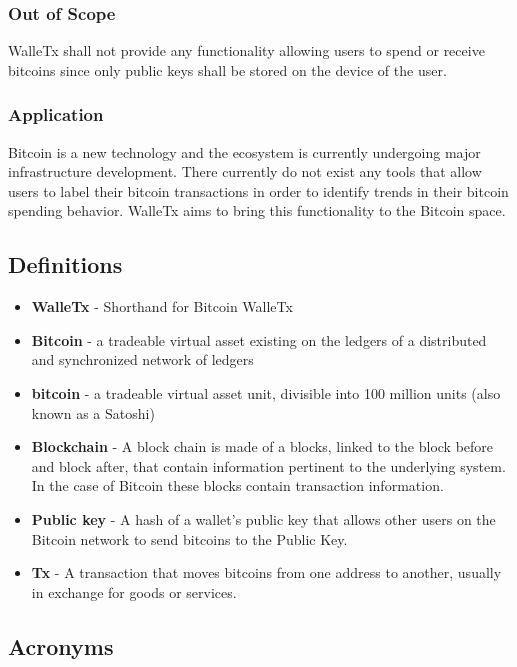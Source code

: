   \subsubsection{Out of Scope}
  WalleTx shall not provide any functionality allowing users to spend or receive bitcoins since only public keys shall be stored on the device of the user.
	
  \subsubsection{Application} 
  Bitcoin is a new technology and the ecosystem is currently undergoing major infrastructure development. There currently do not exist any tools that allow users to label their bitcoin transactions in order to identify trends in their bitcoin spending behavior. WalleTx aims to bring this functionality to the Bitcoin space.
    
	\subsection{Definitions}

	\begin{itemize}
    \item \textbf{WalleTx} - Shorthand for Bitcoin WalleTx
    \item \textbf{Bitcoin} - a tradeable virtual asset existing on the ledgers of a distributed and synchronized network of ledgers
    \item \textbf{bitcoin} - a tradeable virtual asset unit, divisible into 100 million units (also known as a Satoshi) 
    \item \textbf{Blockchain} - A block chain is made of a blocks, linked to the block before and block after, that contain information pertinent to the underlying system. In the case of Bitcoin these blocks contain transaction information.
    \item \textbf{Public key} - A hash of a wallet's public key that allows other users on the Bitcoin network to send bitcoins to the Public Key. 
    \item \textbf{Tx} - A transaction that moves bitcoins from one address to another, usually in exchange for goods or services.
	\end{itemize}

	\subsection{Acronyms}

